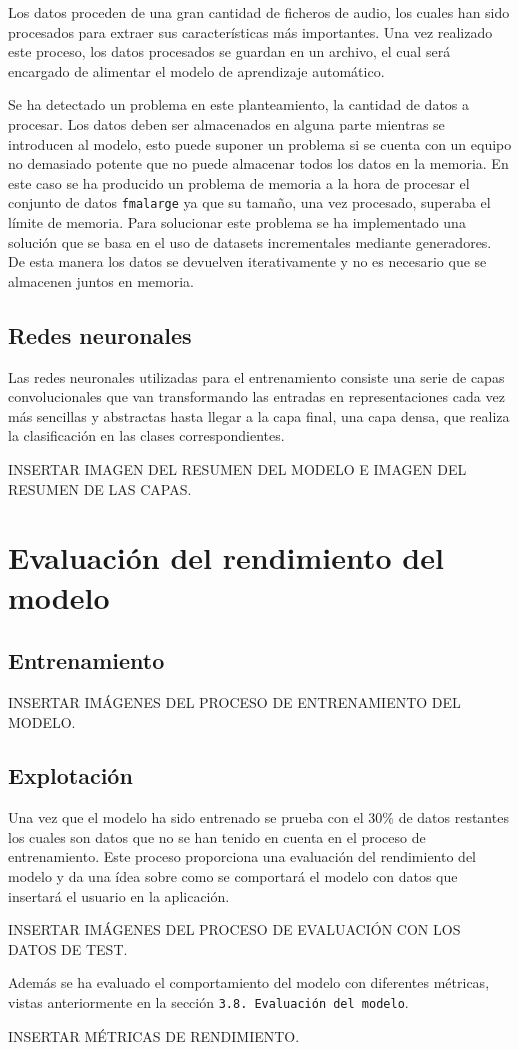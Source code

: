 Los datos proceden de una gran cantidad de ficheros de audio, los cuales han sido procesados para extraer sus características más importantes. Una vez realizado este proceso, los datos procesados se guardan en un archivo, el cual será encargado de alimentar el modelo de aprendizaje automático.

Se ha detectado un problema en este planteamiento, la cantidad de datos a procesar. Los datos deben ser almacenados en alguna parte mientras se introducen al modelo, esto puede suponer un problema si se cuenta con un equipo no demasiado potente que no puede almacenar todos los datos en la memoria. En este caso se ha producido un problema de memoria a la hora de procesar el conjunto de datos \texttt{fma\textunderscore large} ya que su tamaño, una vez procesado, superaba el límite de memoria. Para solucionar este problema se ha implementado una solución que se basa en el uso de datasets incrementales mediante generadores. De esta manera los datos se devuelven iterativamente y no es necesario que se almacenen juntos en memoria.

\subsection{Redes neuronales}

Las redes neuronales utilizadas para el entrenamiento consiste una serie de capas convolucionales que van transformando las entradas en representaciones cada vez más sencillas y abstractas hasta llegar a la capa final, una capa densa, que realiza la clasificación en las clases correspondientes.

INSERTAR IMAGEN DEL RESUMEN DEL MODELO E IMAGEN DEL RESUMEN DE LAS CAPAS.

\section{Evaluación del rendimiento del modelo}

\subsection{Entrenamiento}

INSERTAR IMÁGENES DEL PROCESO DE ENTRENAMIENTO DEL MODELO.

\subsection{Explotación}

Una vez que el modelo ha sido entrenado se prueba con el 30\% de datos restantes los cuales son datos que no se han tenido en cuenta en el proceso de entrenamiento. Este proceso proporciona una evaluación del rendimiento del modelo y da una ídea sobre como se comportará el modelo con datos que insertará el usuario en la aplicación.

INSERTAR IMÁGENES DEL PROCESO DE EVALUACIÓN CON LOS DATOS DE TEST.

Además se ha evaluado el comportamiento del modelo con diferentes métricas, vistas anteriormente en la sección \texttt{3.8. Evaluación del modelo}.

INSERTAR MÉTRICAS DE RENDIMIENTO.